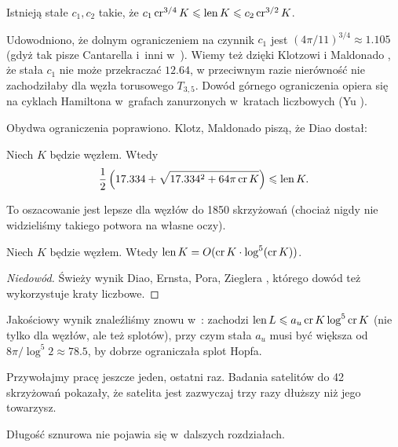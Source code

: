 \begin{proposition}
    Istnieją stałe $c_1, c_2$ takie, że $c_1 \operatorname{cr}^{3/4} K \leqslant \operatorname{len} K \leqslant c_2 \operatorname{cr}^{3/2} K$.
\end{proposition}

Udowodniono, że dolnym ograniczeniem na czynnik $c_1$ jest $(4\pi/11)^{3/4} \approx 1.105$ (gdyż tak pisze Cantarella i~inni w~\cite[tw. 23]{cantarella2002}).
Wiemy też dzięki Klotzowi i Maldonado \cite{klotz2021}, że stała $c_1$ nie może przekraczać $12.64$, w przeciwnym razie nierówność nie zachodziłaby dla węzła torusowego $T_{3,5}$.
%
%
Dowód górnego ograniczenia opiera się na cyklach Hamiltona w~grafach zanurzonych w~kratach liczbowych (Yu \cite{yu2004}).

Obydwa ograniczenia poprawiono.
Klotz, Maldonado \cite{klotz2021} piszą, że Diao dostał:

\begin{proposition}
    Niech $K$ będzie węzłem.
    Wtedy
    \begin{equation}
        \frac 12 \left(17.334 + \sqrt{17.334^2 + 64 \pi \operatorname{cr} K}\right) \leqslant \operatorname{len} K.
    \end{equation}
\end{proposition}

To oszacowanie jest lepsze dla węzłów do 1850 skrzyżowań (chociaż nigdy nie widzieliśmy takiego potwora na własne oczy).


\begin{proposition}
    Niech $K$ będzie węzłem.
    Wtedy $\operatorname{len} K = O(\operatorname{cr} K \cdot \log^5(\operatorname{cr} K))$.
\end{proposition}

\begin{proof}[Niedowód]
    Świeży wynik Diao, Ernsta, Pora, Zieglera \cite{diao2019}, którego dowód też wykorzystuje kraty liczbowe.
\end{proof}

Jakościowy wynik znaleźliśmy znowu w~\cite{klotz2021}: zachodzi $\operatorname{len} L \leqslant a_u \operatorname{cr} K \log^5 \operatorname{cr} K$ (nie tylko dla węzłów, ale też splotów), przy czym stała $a_u$ musi być większa od $8\pi/\log^5 2 \approx 78.5$, by dobrze ograniczała splot Hopfa.

Przywołajmy pracę \cite{klotz2021} jeszcze jeden, ostatni raz.
Badania satelitów do 42 skrzyżowań pokazały, że satelita jest zazwyczaj trzy razy dłuższy niż jego towarzysz.

Długość sznurowa nie pojawia się w~dalszych rozdziałach.

%


